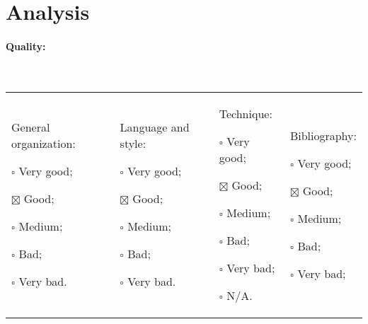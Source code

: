 \documentclass[11pt]{article}
\begin{document}
\section{Analysis}

\paragraph{Quality:} ~\newline
\begin{tabular}{p{}p{}p{}p{}}
\begin{minipage}[t]{.25\textwidth}
General organization:
\begin{description}
\item $\square$ Very good;
\item $\boxtimes$ Good;
\item $\square$ Medium;
\item $\square$ Bad;
\item $\square$ Very bad.
\end{description}
\end{minipage}

&

\begin{minipage}[t]{.25\textwidth}
Language and style:
\begin{description}
\item $\square$ Very good;
\item $\boxtimes$ Good;
\item $\square$ Medium;
\item $\square$ Bad;
\item $\square$ Very bad.
\end{description}
\end{minipage}

&

\begin{minipage}[t]{.25\textwidth}
Technique:
\begin{description}
\item $\square$ Very good;
\item $\boxtimes$ Good;
\item $\square$ Medium;
\item $\square$ Bad;
\item $\square$ Very bad;
\item $\square$ N/A.
\end{description}
\end{minipage}

&

\begin{minipage}[t]{.25\textwidth}
Bibliography:
\begin{description}
\item $\square$ Very good;
\item $\boxtimes$ Good;
\item $\square$ Medium;
\item $\square$ Bad;
\item $\square$ Very bad;
\end{description}
\end{minipage}
\end{tabular}
\end{document}
